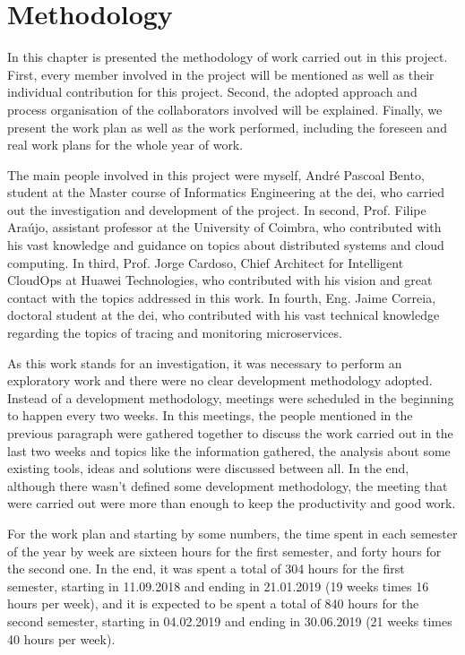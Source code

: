 \glsresetall
\chapter{Methodology}
\label{chap:methodology}

In this chapter is presented the methodology of work carried out in this project. First, every member involved in the project will be mentioned as well as their individual contribution for this project. Second, the adopted approach and process organisation of the collaborators involved will be explained. Finally, we present the work plan as well as the work performed, including the foreseen and real work plans for the whole year of work.

The main people involved in this project were myself, André Pascoal Bento, student at the Master course of Informatics Engineering at the \gls{dei}, who carried out the investigation and development of the project. In second, Prof. Filipe Araújo, assistant professor at the University of Coimbra, who contributed with his vast knowledge and guidance on topics about distributed systems and cloud computing. In third, Prof. Jorge Cardoso, Chief Architect for Intelligent CloudOps at Huawei Technologies, who contributed with his vision and great contact with the topics addressed in this work. In fourth, Eng. Jaime Correia, doctoral student at the \gls{dei}, who contributed with his vast technical knowledge regarding the topics of tracing and monitoring microservices.

As this work stands for an investigation, it was necessary to perform an exploratory work and there were no clear development methodology adopted. Instead of a development methodology, meetings were scheduled in the beginning to happen every two weeks. In this meetings, the people mentioned in the previous paragraph were gathered together to discuss the work carried out in the last two weeks and topics like the information gathered, the analysis about some existing tools, ideas and solutions were discussed between all. In the end, although there wasn't defined some development methodology, the meeting that were carried out were more than enough to keep the productivity and good work.

For the work plan and starting by some numbers, the time spent in each semester of the year by week are sixteen hours for the first semester, and forty hours for the second one. In the end, it was spent a total of 304 hours for the first semester, starting in 11.09.2018 and ending in 21.01.2019 (19 weeks times 16 hours per week), and it is expected to be spent a total of 840 hours for the second semester, starting in 04.02.2019 and ending in 30.06.2019 (21 weeks times 40 hours per week).

